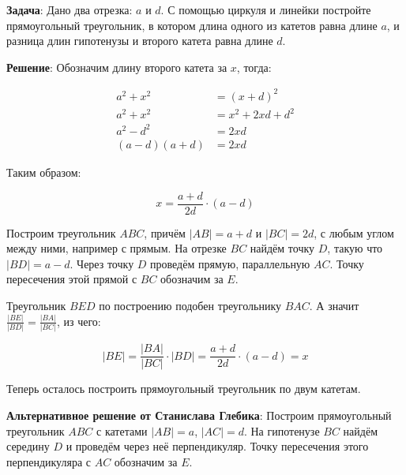 \documentclass{article} %
\begin{document}
\textbf{Задача}: Дано два отрезка: $a$ и $d$. С помощью циркуля и линейки постройте прямоугольный треугольник, в котором длина одного из катетов равна длине $a$, и разница длин гипотенузы и второго катета равна длине $d$.

\textbf{Решение}: Обозначим длину второго катета за $x$, тогда:

\begin{align*}
  a^2 + x^2 &= (x+d)^2 \\
  a^2 + x^2 &= x^2 + 2xd + d^2 \\
  a^2 - d^2 &= 2xd \\
  (a - d) (a + d) &= 2xd
\end{align*}

Таким образом:

\begin{equation}
  x = \frac{a + d}{2d} \cdot (a - d) 
\end{equation}

Построим треугольник $ABC$, причём $|AB| = a + d$ и $|BC| = 2d$, с любым углом между ними, например с прямым.
На отрезке $BC$ найдём точку $D$, такую что $|BD| = a - d$.
Через точку $D$ проведём прямую, параллельную $AC$. Точку пересечения этой прямой с $BC$ обозначим за $E$.

\begin{center}
\end{center}

Треугольник $BED$ по построению подобен треугольнику $BAC$. А значит $\frac{|BE|}{|BD|} = \frac{|BA|}{|BC|}$, из чего:

\begin{equation}
  |BE| = \frac{|BA|}{|BC|} \cdot |BD| = \frac{a + d}{2d} \cdot (a - d) = x
\end{equation}

Теперь осталось построить прямоугольный треугольник по двум катетам.

\textbf{Альтернативное решение от Станислава Глебика}: Построим прямоугольный треугольник $ABC$ с катетами $|AB|=a$, $|AC|=d$.
На гипотенузе $BC$ найдём середину $D$ и проведём через неё перпендикуляр. Точку пересечения этого перпендикуляра с $AC$ обозначим за $E$.
\end{document}
